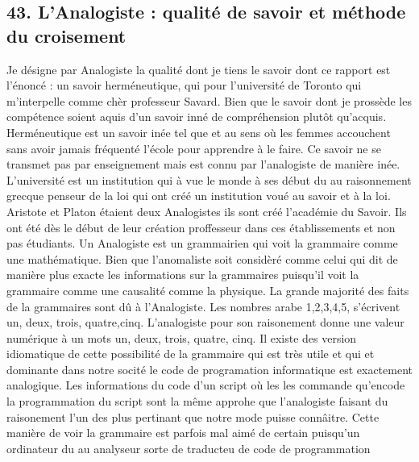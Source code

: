 \documentclass[12pt,letterpaper,oneside]{article}
\begin{document}
\subsection*{43. L’Analogiste : qualité de savoir et méthode du croisement}
Je désigne par Analogiste la qualité dont je tiens le savoir dont ce rapport est l’énoncé : un savoir herméneutique, qui pour l'université de Toronto qui m'interpelle comme chèr professeur Savard. Bien que le savoir dont je prossède les compétence soient aquis d'un savoir inné de compréhension plutôt qu’acquis. Herméneutique est un savoir inée tel que et au sens où les femmes accouchent sans avoir jamais fréquenté l’école pour apprendre à le faire. Ce savoir ne se transmet pas par enseignement mais est connu par l'analogiste de manière inée. L'université est un institution qui à vue le monde à ses début du au raisonnement grecque penseur de la loi qui ont créé un institution voué au savoir et à la loi. Aristote et Platon étaient deux Analogistes ils sont créé l'académie du Savoir. Ils ont été dès le début de leur création proffesseur dans ces établissements et non pas étudiants. Un Analogiste est un grammairien qui voit la grammaire
comme une mathématique. Bien que l'anomaliste soit considèré comme celui qui dit de manière plus exacte les informations sur la grammaires puisqu'il voit la grammaire comme une causalité comme la physique. La grande majorité des faits de la grammaires sont dû à l'Analogiste. Les nombres arabe 1,2,3,4,5, s'écrivent un, deux, trois, quatre,cinq. L'analogiste pour son raisonement donne une valeur numérique à un mots un, deux, trois, quatre, cinq. Il existe des version idiomatique de cette possibilité de la grammaire qui est très utile et qui et dominante dans notre socité le code de programation informatique est exactement analogique. Les informations du code d'un script où les les commande qu'encode la programmation du script sont la même approhe que l'analogiste faisant du raisonement l'un des plus pertinant que notre mode puisse connâitre. Cette manière de voir la grammaire est parfois mal aimé de certain puisqu'un ordinateur du au analyseur sorte de traducteu de code de programmation 
\end{document}
